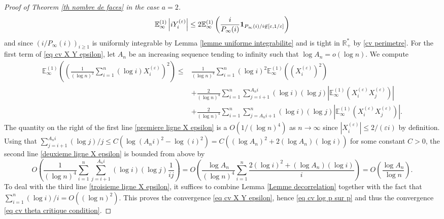 \documentclass[11pt]{article}
\numberwithin{equation}{section}
\def\vp{\varepsilon}
\def \R{\mathbb {R}}
\def\E{\mathbb{E}}
\begin{document}
\begin{proof}[Proof of Theorem \ref{th nombre de faces} in the case $a=2$]
$$
\E^{(1)}_\infty \left\vert i Y^{(\vp)}_i \right\vert 
\le  2 \E^{(1)}_\infty \left(
\frac{i}{P_\infty(i)} {\bf 1}_{P_\infty(i)/i \not\in [\vp, 1/\vp]}
\right)
$$
and since $(i/P_\infty(i))_{i\ge 1}$ is uniformly integrable by Lemma \ref{lemme uniforme integrabilite} and is tight in $\R_+^*$ by \eqref{cv perimetre}. 
For the first term of \eqref{eq cv X Y epsilon}, let $A_n$ be an increasing sequence tending to infinity such that $\log A_n = o(\log n)$. We compute
\begin{align}
\! \!\!\!\E^{(1)}_\infty\left(
\left(
\frac{1}{(\log n)^2}\sum_{i=1}^n (\log i)X^{(\vp)}_i
\right)^2
\right)
\le
&\frac{1}{(\log n )^4} \sum_{i=1}^n (\log i )^2 \E^{(1)}_\infty\left(\left(X^{(\vp)}_i\right)^2\right) \label{premiere ligne X epsilon}\\
&+ \frac{2}{(\log n)^4} \sum_{i=1}^n \sum_{j=i+1}^{A_ni} 
(\log i)(\log j)
\left\vert \E^{(1)}_\infty \left(X^{(\vp)}_i X^{(\vp)}_j \right) \right\vert \label{deuxieme ligne X epsilon} \\
&+\frac{2}{(\log n)^4} \sum_{i=1}^n \sum_{j=A_n i+1}^{n} 
(\log i)(\log j)
\left\vert \E^{(1)}_\infty \left(X^{(\vp)}_i X^{(\vp)}_j \right) \right\vert. 	  \label{troisieme ligne X epsilon}
\end{align}
The quantity on the right of the first line \eqref{premiere ligne X epsilon} is a $O(1/(\log n)^4)$ as $n\to \infty$ since $|X_i^{(\vp)}|\le 2/(\vp i)$ by definition. Using that $\sum_{j=i+1}^{A_n i }( \log j)/j \le C(\log (A_ni)^2 - \log (i)^2) =C( (\log A_n)^2 + 2 (\log A_n)( \log i))$ for some constant $C>0$, the second line \eqref{deuxieme ligne X epsilon} is {bounded from above} by
$$O\!\left(\frac{1}{(\log n)^4}\sum_{i=1}^n \sum_{j=i+1}^{A_ni} (\log i)(\log j)\frac{1}{ij} \right) 
=O\!\left(
\frac{\log A_n}{(\log n)^4} \sum_{i=1}^n \frac{2(\log i)^2 + (\log A_n)(\log i)}{i}
\right)
=
 O\!\left(\frac{\log A_n}{\log n}\right).$$
To deal with the third line \eqref{troisieme ligne X epsilon}, it suffices to combine Lemma \ref{Lemme decorrelation} together with the fact that $\sum_{i=1}^n (\log i)/i = O((\log n)^2)$. This proves the convergence \eqref{eq cv X Y epsilon}, hence \eqref{eq cv log p sur p} and thus the convergence \eqref{eq cv theta critique condition}.





\end{proof}
\end{document}
